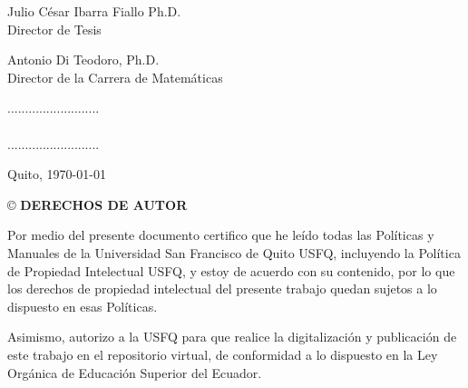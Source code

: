 \documentclass[a4paper, 12pt]{report}
\begin{document}
\begin{minipage}{0.6\linewidth}   

  \Large Julio César Ibarra Fiallo Ph.D.\\
  \vspace{0.1cm}
  \small Director de Tesis
  \vspace{1cm}

  \Large Antonio Di Teodoro, Ph.D.\\
  \vspace{0.1cm}
  \small Director de la Carrera de Matemáticas
\end{minipage}
\begin{minipage}{0.3\linewidth}
  \Large ..........................\\
  \vspace{0.8cm}\\                    
  \Large ..........................
\end{minipage}

\vfill 
\begin{center}
\large Quito, \today
\end{center}

\newpage
\begin{center}
\begin{large}
\copyright \hspace{0.1cm} \textbf{DERECHOS DE AUTOR}
\end{large}
\end{center}

\setlength{\parskip}{5mm}

\noindent
\large Por medio del presente documento certifico que he leído todas las Políticas y Manuales de la Universidad San Francisco de Quito USFQ, incluyendo la Política de Propiedad Intelectual USFQ, y estoy de acuerdo con su contenido, por lo que los derechos de propiedad intelectual del presente trabajo quedan sujetos a lo dispuesto en esas Políticas. 

\noindent
\large Asimismo, autorizo a la USFQ para que realice la digitalización y publicación de este trabajo en el repositorio virtual, de conformidad a lo dispuesto en la Ley Orgánica de Educación Superior del Ecuador.
\end{document}
